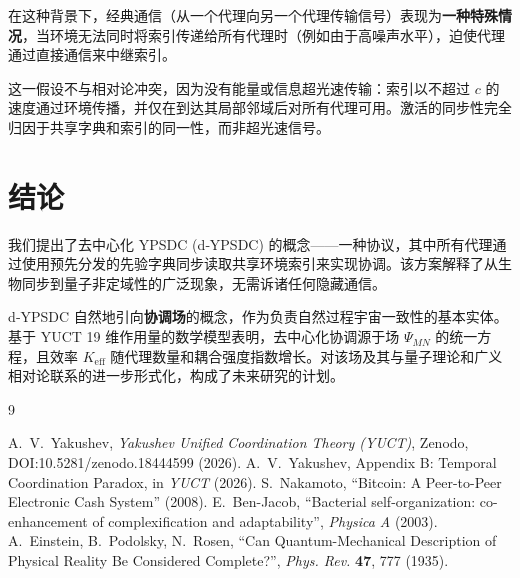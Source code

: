 \documentclass[11pt,a4paper]{article}
\begin{document}
	在这种背景下，经典通信（从一个代理向另一个代理传输信号）表现为\textbf{一种特殊情况}，当环境无法同时将索引传递给所有代理时（例如由于高噪声水平），迫使代理通过直接通信来中继索引。
	
	这一假设不与相对论冲突，因为没有能量或信息超光速传输：索引以不超过 \(c\) 的速度通过环境传播，并仅在到达其局部邻域后对所有代理可用。激活的同步性完全归因于共享字典和索引的同一性，而非超光速信号。
	
	\section{结论}
	
	我们提出了去中心化 YPSDC (d‑YPSDC) 的概念——一种协议，其中所有代理通过使用预先分发的先验字典同步读取共享环境索引来实现协调。该方案解释了从生物同步到量子非定域性的广泛现象，无需诉诸任何隐藏通信。
	
	d‑YPSDC 自然地引向\textbf{协调场}的概念，作为负责自然过程宇宙一致性的基本实体。基于 YUCT 19 维作用量的数学模型表明，去中心化协调源于场 \(\Psi_{MN}\) 的统一方程，且效率 \(K_{\mathrm{eff}}\) 随代理数量和耦合强度指数增长。对该场及其与量子理论和广义相对论联系的进一步形式化，构成了未来研究的计划。
	
	\begin{thebibliography}{9}
		\begin{otherlanguage}{english}
			 A.~V.~Yakushev, \emph{Yakushev Unified Coordination Theory (YUCT)}, Zenodo, DOI:10.5281/zenodo.18444599 (2026).
			 A.~V.~Yakushev, Appendix B: Temporal Coordination Paradox, in \emph{YUCT} (2026).
			 S.~Nakamoto, ``Bitcoin: A Peer-to-Peer Electronic Cash System'' (2008).
			 E.~Ben-Jacob, ``Bacterial self-organization: co-enhancement of complexification and adaptability'', \emph{Physica A} (2003).
			 A.~Einstein, B.~Podolsky, N.~Rosen, ``Can Quantum-Mechanical Description of Physical Reality Be Considered Complete?'', \emph{Phys. Rev.} \textbf{47}, 777 (1935).
		\end{otherlanguage}
	\end{thebibliography}
	
\end{document}
